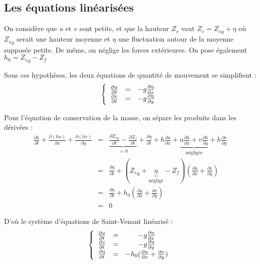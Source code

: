 \subsection{Les équations linéarisées}

On considère que $u$ et $v$ sont petits, et que la hauteur $Z_s$ vaut $Z_s={Z_s}_0+\eta$ où ${Z_s}_0$ serait une hauteur moyenne et $\eta$ une fluctuation autour de la moyenne supposée petite. De même, on néglige les forces extérieures. On pose également $h_0 = {Z_s}_0 - Z_f$

Sous ces hypothèses, les deux équations de quantité de mouvement se simplifient :
\[\left\{\begin{array}{c c c}
	\frac{\partial u}{\partial t} &=& -g\frac{\partial \eta}{\partial x} \\
	\frac{\partial v}{\partial t} &=& -g\frac{\partial \eta}{\partial y} 
\end{array}\right.\]

Pour l'équation de conservation de la masse, on sépare les produits dans les dérivées :
\begin{eqnarray*}
	\frac{\partial h}{\partial t} + \frac{\partial (hu)}{\partial x} + \frac{\partial (hv)}{\partial y} &=& \underbrace{\frac{\partial {Z_s}_0}{\partial t} - \frac{\partial Z_f}{\partial t}}_{=0} + \frac{\partial \eta}{\partial t} + h\frac{\partial u}{\partial x} + \underbrace{u \frac{\partial h}{\partial x} + v\frac{\partial h}{\partial y}}_{\text{négligés}} + h\frac{\partial v}{\partial y} \\
	     &=&\frac{\partial \eta}{\partial t} + ({Z_s}_0 + \underbrace{\eta}_{\text{négligé}} - Z_f)\left(\frac{\partial u}{\partial x} + \frac{\partial v}{\partial y} \right) \\
	     &=&\frac{\partial \eta}{\partial t} + h_0\left(\frac{\partial u}{\partial x} + \frac{\partial v}{\partial y} \right) \\
		&=& 0
\end{eqnarray*}

D'où le système d'équations de Saint-Venant linéarisé :
\begin{equation}\label{II-4-4}
	\left\{ 
	\begin{array}{c c c}
		\frac{\partial u}{\partial t}	& = & -g \frac{\partial \eta}{\partial x}\\
		\frac{\partial v}{\partial t} & = & -g  \frac{\partial \eta}{\partial y}\\
      \frac{\partial \eta}{\partial t} & = & - h_0  (\frac{\partial u}{\partial x}+\frac{\partial v}{\partial y} )\\
		
		
	\end{array}
	\right.
\end{equation}
